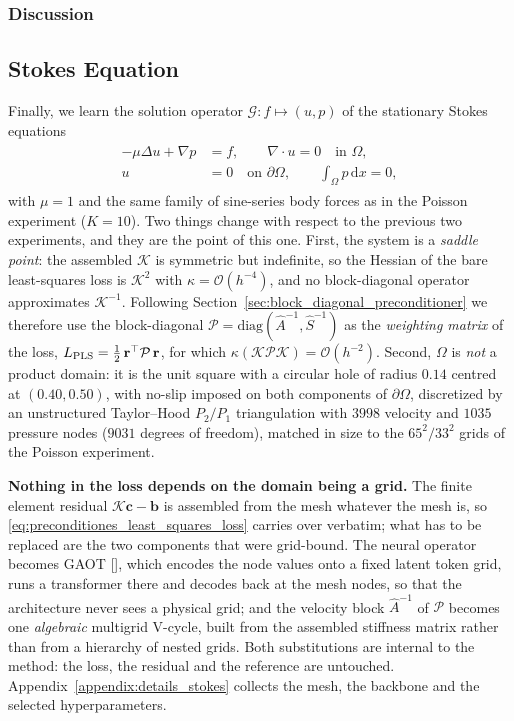 \documentclass{article} %
\begin{document}
\subsubsection{Discussion}



\subsection{Stokes Equation}
Finally, we learn the solution operator $\mathcal G: f \mapsto (u, p)$ of the stationary Stokes equations
\begin{align}\label{eq:stokes_equation}
   \begin{split}
      -\mu\Delta u + \nabla p &= f, \qquad \nabla\cdot u = 0 \quad \text{in } \Omega,
      \\
      u &= 0 \quad \text{on } \partial\Omega, \qquad \textstyle\int_\Omega p\,\mathrm dx = 0,
   \end{split}
\end{align}
with $\mu = 1$ and the same family of sine-series body forces as in the Poisson experiment ($K = 10$). Two things change with respect to the previous two experiments, and they are the point of this one. First, the system is a \emph{saddle point}: the assembled $\mathcal K$ is symmetric but indefinite, so the Hessian of the bare least-squares loss is $\mathcal K^2$ with $\kappa = \mathcal O(h^{-4})$, and no block-diagonal operator approximates $\mathcal K^{-1}$. Following Section~\ref{sec:block_diagonal_preconditioner} we therefore use the block-diagonal $\mathcal P = \mathrm{diag}(\hat A^{-1}, \hat S^{-1})$ as the \emph{weighting matrix} of the loss, $L_{\textup{PLS}} = \tfrac12\,\mathbf r^\top \mathcal P\, \mathbf r$, for which $\kappa(\mathcal K \mathcal P \mathcal K) = \mathcal O(h^{-2})$. Second, $\Omega$ is \emph{not} a product domain: it is the unit square with a circular hole of radius $0.14$ centred at $(0.40, 0.50)$, with no-slip imposed on both components of $\partial\Omega$, discretized by an unstructured Taylor--Hood $P_2/P_1$ triangulation with $3998$ velocity and $1035$ pressure nodes ($9031$ degrees of freedom), matched in size to the $65^2/33^2$ grids of the Poisson experiment.

\textbf{Nothing in the loss depends on the domain being a grid.} The finite element residual $\mathcal K\mathbf c - \mathbf b$ is assembled from the mesh whatever the mesh is, so \eqref{eq:preconditiones_least_squares_loss} carries over verbatim; what has to be replaced are the two components that were grid-bound. The neural operator becomes GAOT [], which encodes the node values onto a fixed latent token grid, runs a transformer there and decodes back at the mesh nodes, so that the architecture never sees a physical grid; and the velocity block $\hat A^{-1}$ of $\mathcal P$ becomes one \emph{algebraic} multigrid V-cycle, built from the assembled stiffness matrix rather than from a hierarchy of nested grids. Both substitutions are internal to the method: the loss, the residual and the reference are untouched. Appendix~\ref{appendix:details_stokes} collects the mesh, the backbone and the selected hyperparameters.
\end{document}
